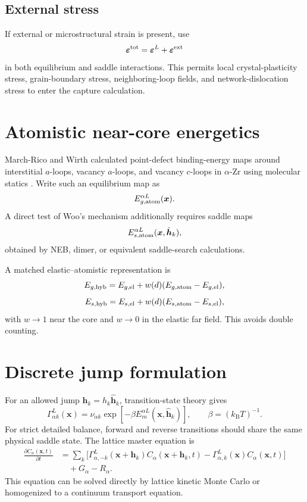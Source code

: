 \documentclass[11pt]{article}
\newcommand{\kb}{k_{\mathrm B}}
\newcommand{\beps}{\bm{\varepsilon}}
\newcommand{\bx}{\bm{x}}
\newcommand{\bh}{\bm{h}}
\begin{document}
\subsection{External stress}
If external or microstructural strain is present, use
\begin{equation}
\beps^{\rm tot}=\beps^L+\beps^{\rm ext}
\end{equation}
in both equilibrium and saddle interactions. This permits local crystal-plasticity stress, grain-boundary stress, neighboring-loop fields, and network-dislocation stress to enter the capture calculation.

\section{Atomistic near-core energetics}
March-Rico and Wirth calculated point-defect binding-energy maps around interstitial $a$-loops, vacancy $a$-loops, and vacancy $c$-loops in $\alpha$-Zr using molecular statics \cite{MarchRicoWirth2023}. Write such an equilibrium map as
\begin{equation}
E_{g,\rm atom}^{\alpha L}(\bx).
\end{equation}
A direct test of Woo's mechanism additionally requires saddle maps
\begin{equation}
E_{s,\rm atom}^{\alpha L}(\bx,\hat{\bh}_k),
\end{equation}
obtained by NEB, dimer, or equivalent saddle-search calculations.

A matched elastic--atomistic representation is
\begin{equation}
E_{g,\rm hyb}=E_{g,\rm el}+w(d)(E_{g,\rm atom}-E_{g,\rm el}),
\end{equation}
\begin{equation}
E_{s,\rm hyb}=E_{s,\rm el}+w(d)(E_{s,\rm atom}-E_{s,\rm el}),
\end{equation}
with $w\to1$ near the core and $w\to0$ in the elastic far field. This avoids double counting.

\section{Discrete jump formulation}
For an allowed jump $\bh_k=h_k\hat{\bh}_k$, transition-state theory gives
\begin{equation}
\boxed{\Gamma_{\alpha k}^{L}(\bx)=\nu_{\alpha k}\exp[-\beta E_m^{\alpha L}(\bx,\hat{\bh}_k)]},\qquad \beta=(\kb T)^{-1}.
\end{equation}
For strict detailed balance, forward and reverse transitions should share the same physical saddle state. The lattice master equation is
\begin{align}
\frac{\partial C_\alpha(\bx,t)}{\partial t}
&=\sum_k\Big[\Gamma_{\alpha,-k}^{L}(\bx+\bh_k)C_\alpha(\bx+\bh_k,t)
-\Gamma_{\alpha,k}^{L}(\bx)C_\alpha(\bx,t)\Big]\\
&\quad+G_\alpha-R_\alpha.
\end{align}
This equation can be solved directly by lattice kinetic Monte Carlo or homogenized to a continuum transport equation.
\end{document}
